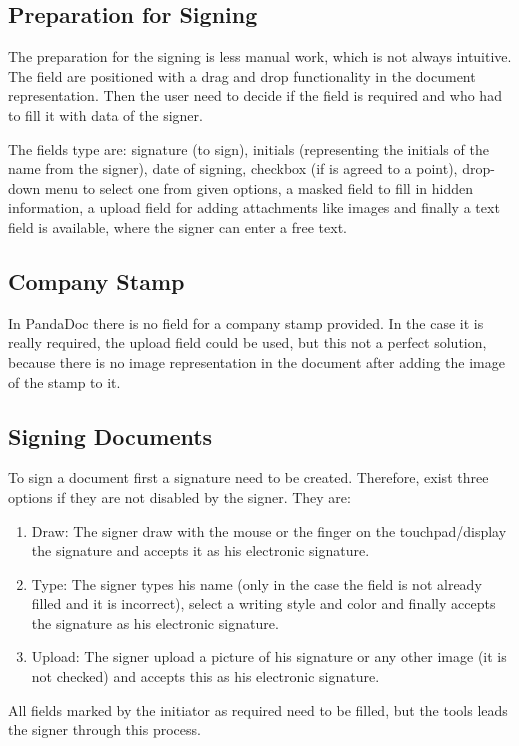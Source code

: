 \subsection{Preparation for Signing}
The preparation for the signing is less manual work, which is not always intuitive. The field are positioned with a drag and drop functionality in the document representation. Then the user need to decide if the field is required and who had to fill it with data of the signer.

The fields type are: signature (to sign), initials (representing the initials of the name from the signer), date of signing, checkbox (if is agreed to a point), drop-down menu to select one from given options, a masked field to fill in hidden information, a upload field for adding attachments like images and finally a text field is available, where the signer can enter a free text.

\subsection{Company Stamp}
In PandaDoc there is no field for a company stamp provided. In the case it is really required, the upload field could be used, but this not a perfect solution, because there is no image representation in the document after adding the image of the stamp to it.

\subsection{Signing Documents}
To sign a document first a signature need to be created. Therefore, exist three options if they are not disabled by the signer. They are:
\begin{enumerate}
	\item Draw: The signer draw with the mouse or the finger on the touchpad/display the signature and accepts it as his electronic signature.
	\item Type: The signer types his name (only in the case the field is not already filled and it is incorrect), select a writing style and color and finally accepts the signature as his electronic signature.
	\item Upload: The signer upload a picture of his signature or any other image (it is not checked) and accepts this as his electronic signature.
\end{enumerate}
All fields marked by the initiator as required  need to be filled, but the tools leads the signer through this process.

